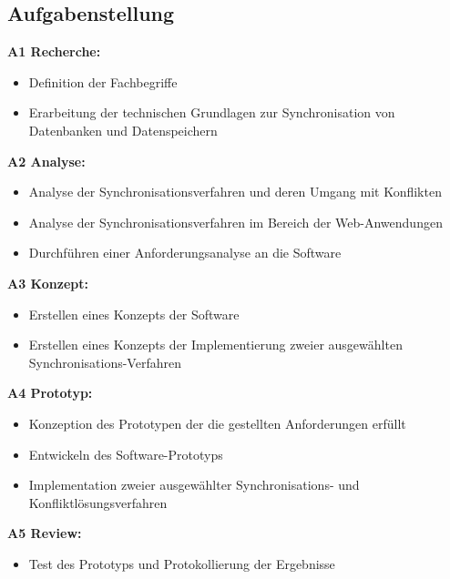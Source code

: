\documentclass[oneside,11pt,parskip=half,ngerman]{scrreprt}
\begin{document}
\subsection{Aufgabenstellung}\label{aufgabenstellung-1}

\textbf{A1 Recherche:}

\begin{itemize}
\itemsep1pt\parskip0pt
\item
  Definition der Fachbegriffe
\item
  Erarbeitung der technischen Grundlagen zur Synchronisation von
  Datenbanken und Datenspeichern
\end{itemize}

\textbf{A2 Analyse:}

\begin{itemize}
\itemsep1pt\parskip0pt
\item
  Analyse der Synchronisationsverfahren und deren Umgang mit Konflikten
\item
  Analyse der Synchronisationsverfahren im Bereich der Web-Anwendungen
\item
  Durchführen einer Anforderungsanalyse an die Software
\end{itemize}

\textbf{A3 Konzept:}

\begin{itemize}
\itemsep1pt\parskip0pt
\item
  Erstellen eines Konzepts der Software
\item
  Erstellen eines Konzepts der Implementierung zweier ausgewählten
  Synchronisations-Verfahren
\end{itemize}

\textbf{A4 Prototyp:}

\begin{itemize}
\itemsep1pt\parskip0pt
\item
  Konzeption des Prototypen der die gestellten Anforderungen erfüllt
\item
  Entwickeln des Software-Prototyps
\item
  Implementation zweier ausgewählter Synchronisations- und
  Konfliktlösungsverfahren
\end{itemize}

\textbf{A5 Review:}

\begin{itemize}
\itemsep1pt\parskip0pt
\item
  Test des Prototyps und Protokollierung der Ergebnisse
\end{itemize}
\end{document}
